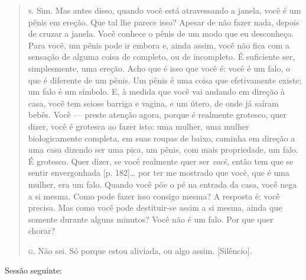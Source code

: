 \begin{quote}
\noindent\hskip0mm\textsc{s.} Sim. Mas antes disso, quando você está atravessando a janela, você é
um pênis em ereção. Que tal lhe parece isso? Apesar de não fazer nada,
depois de cruzar a janela. Você conhece o pênis de um modo que eu
desconheço. Para você, um pênis pode ir embora e, ainda assim, você não
fica com a sensação de alguma coisa de completo, ou de incompleto. É
suficiente ser, simplesmente, uma ereção. Acho que é isso que você é:
você é um falo, o que é diferente de um pênis. Um pênis é uma coisa que
efetivamente existe; um falo é um símbolo.\idxpervsimbo{} E, à medida que você vai andando
em direção à casa, você tem seios\idxseios[|)] e barriga e vagina, e um útero, de
onde já saíram bebês. Você --- preste atenção agora, porque é
realmente grotesco, quer dizer, você é grotesca ao fazer isto: uma
mulher, uma mulher biologicamente completa, em suas roupas de baixo,
caminha em direção a uma casa dizendo ser uma pica, um pênis,\idxpenisimag{} com mais
propriedade, um falo. É grotesco. Quer dizer, se você realmente quer
ser \textit{você}, então tem que se sentir envergonhada [p. 182]\ldots{} por
ter me mostrado que você, que é uma mulher, era um falo. Quando você
põe o pé na entrada da casa, você nega a si mesma. Como pode fazer isso
consigo mesma? A resposta é: você precisa. Mas como você pode
destituir-se assim a si mesma, ainda que somente durante alguns
minutos? Você não é um falo.\idxidenhis{} Por que quer chorar?

\noindent\hskip0mm\textsc{g.} Não sei. Só porque estou aliviada, ou algo assim. [Silêncio].

\end{quote}

\bigskip

Sessão seguinte:

\bigskip

